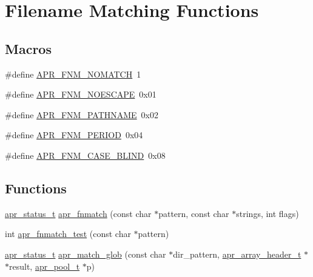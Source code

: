 \hypertarget{group__apr__fnmatch}{}\section{Filename Matching Functions}
\label{group__apr__fnmatch}
\subsection*{Macros}
\begin{DoxyCompactItemize}
\item 
\#define \hyperlink{group__apr__fnmatch_gaea769621807400e4c741e7deddf6c3df}{A\+P\+R\+\_\+\+F\+N\+M\+\_\+\+N\+O\+M\+A\+T\+CH}~1
\item 
\#define \hyperlink{group__apr__fnmatch_gae12c1286631f316647be6dc007170630}{A\+P\+R\+\_\+\+F\+N\+M\+\_\+\+N\+O\+E\+S\+C\+A\+PE}~0x01
\item 
\#define \hyperlink{group__apr__fnmatch_ga0d421a2cef68cb590f958b5de6c7fe1b}{A\+P\+R\+\_\+\+F\+N\+M\+\_\+\+P\+A\+T\+H\+N\+A\+ME}~0x02
\item 
\#define \hyperlink{group__apr__fnmatch_ga4806f936b6eacc59dfed831d67b750ef}{A\+P\+R\+\_\+\+F\+N\+M\+\_\+\+P\+E\+R\+I\+OD}~0x04
\item 
\#define \hyperlink{group__apr__fnmatch_ga5cee1c0a917a283a193721d11160b502}{A\+P\+R\+\_\+\+F\+N\+M\+\_\+\+C\+A\+S\+E\+\_\+\+B\+L\+I\+ND}~0x08
\end{DoxyCompactItemize}
\subsection*{Functions}
\begin{DoxyCompactItemize}
\item 
\hyperlink{group__apr__errno_gaf76ee4543247e9fb3f3546203e590a6c}{apr\+\_\+status\+\_\+t} \hyperlink{group__apr__fnmatch_gabe9c7d7efe6afc203a01befbc45bad96}{apr\+\_\+fnmatch} (const char $\ast$pattern, const char $\ast$strings, int flags)
\item 
int \hyperlink{group__apr__fnmatch_ga4e7828bb7be756d999f13b8af8202204}{apr\+\_\+fnmatch\+\_\+test} (const char $\ast$pattern)
\item 
\hyperlink{group__apr__errno_gaf76ee4543247e9fb3f3546203e590a6c}{apr\+\_\+status\+\_\+t} \hyperlink{group__apr__fnmatch_ga25c7eacaa966d0c9c09ef160644ac997}{apr\+\_\+match\+\_\+glob} (const char $\ast$dir\+\_\+pattern, \hyperlink{structapr__array__header__t}{apr\+\_\+array\+\_\+header\+\_\+t} $\ast$$\ast$result, \hyperlink{group__apr__pools_gaf137f28edcf9a086cd6bc36c20d7cdfb}{apr\+\_\+pool\+\_\+t} $\ast$p)
\end{DoxyCompactItemize}


